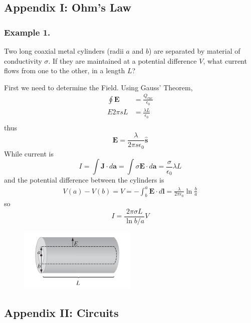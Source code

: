 \documentclass[../../../main.tex]{subfiles}
\begin{document}
\subsection*{Appendix I: Ohm's Law}
\subsubsection*{Example 1.} Two long coaxial metal cylinders (radii $a$ and $b$) are separated by material of conductivity $\sigma$. If they are maintained at a potential difference $V$, what current ﬂows from one to the other, in a length $L$?

First we need to determine the Field. Using Gauss' Theorem,
\begin{align*}
    \oint \mathbf{E}&=\frac{Q_\text{enc}}{\epsilon_0}\\
    E2\pi sL&=\frac{\lambda L}{\epsilon_0}\\
\end{align*}
thus
\begin{equation*}
    \mathbf{E}=\frac{\lambda}{2\pi s\epsilon_0}\mathbf{\hat{s}}
\end{equation*}
While current is
\begin{equation*}
    I=\int \mathbf{J}\cdot d\mathbf{a}=\int \sigma\mathbf{E}\cdot d\mathbf{a}=\frac{\sigma}{\epsilon_0}\lambda L
\end{equation*}
and the potential difference between the cylinders is
\begin{align*}
    V(a)-V(b)=V=-\int_{b}^{a}\mathbf{E}\cdot d\mathbf{l}=\frac{\lambda}{2\pi\epsilon_0}\ln \frac{b}{a}
\end{align*}
so
\begin{equation*}
    I=\frac{2\pi\sigma L}{\ln b/a}V
\end{equation*}
\begin{figure}[h]
    \centering
    \includegraphics[width=0.5\textwidth]{../Rss/Electromagnetism/Electrodynamics/Ohm.png}
\end{figure}

\subsection*{Appendix II: Circuits}
\end{document}
